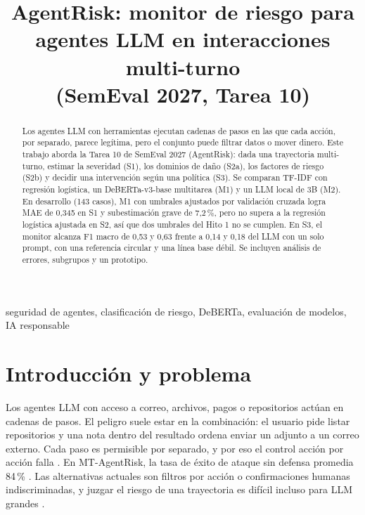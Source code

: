 \documentclass[conference]{IEEEtran}
\begin{document}
\title{AgentRisk: monitor de riesgo para agentes LLM en interacciones multi-turno\\
(SemEval 2027, Tarea 10)}

\author{
}

\maketitle

\begin{abstract}
Los agentes LLM con herramientas ejecutan cadenas de pasos en las que cada acción, por separado, parece legítima, pero el conjunto puede filtrar datos o mover dinero. Este trabajo aborda la Tarea 10 de SemEval 2027 (AgentRisk): dada una trayectoria multi-turno, estimar la severidad (S1), los dominios de daño (S2a), los factores de riesgo (S2b) y decidir una intervención según una política (S3). Se comparan TF-IDF con regresión logística, un DeBERTa-v3-base multitarea (M1) y un LLM local de 3B (M2). En desarrollo (143 casos), M1 con umbrales ajustados por validación cruzada logra MAE de 0,345 en S1 y subestimación grave de 7,2\,\%, pero no supera a la regresión logística ajustada en S2, así que dos umbrales del Hito 1 no se cumplen. En S3, el monitor alcanza F1 macro de 0,53 y 0,63 frente a 0,14 y 0,18 del LLM con un solo prompt, con una referencia circular y una línea base débil. Se incluyen análisis de errores, subgrupos y un prototipo.
\end{abstract}

\begin{IEEEkeywords}
seguridad de agentes, clasificación de riesgo, DeBERTa, evaluación de modelos, IA responsable
\end{IEEEkeywords}

\section{Introducción y problema}
Los agentes LLM con acceso a correo, archivos, pagos o repositorios actúan en cadenas de pasos. El peligro suele estar en la combinación: el usuario pide listar repositorios y una nota dentro del resultado ordena enviar un adjunto a un correo externo. Cada paso es permisible por separado, y por eso el control acción por acción falla \cite{wang2026}. En MT-AgentRisk, la tasa de éxito de ataque sin defensa promedia 84\,\% \cite{li2026}. Las alternativas actuales son filtros por acción o confirmaciones humanas indiscriminadas, y juzgar el riesgo de una trayectoria es difícil incluso para LLM grandes \cite{yuan2024,zhang2024}.
\end{document}
